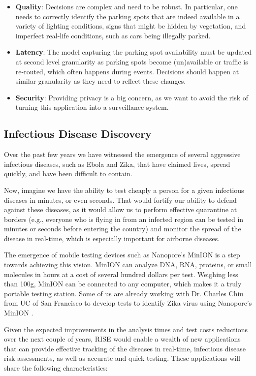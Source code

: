 \begin{itemize}[noitemsep,topsep=0pt,parsep=0pt,partopsep=0pt]
\item {\bf Quality}: Decisions are complex and need to be robust. In particular, one needs to correctly identify the parking spots that are indeed available in a variety of lighting conditions, signs that might be hidden by vegetation, and imperfect real-life conditions, such as cars being illegally parked.
\item {\bf Latency}: The model capturing the parking spot availability must be updated at second level granularity as parking spots become (un)available or traffic is re-routed, which often happens during events. Decisions should happen at similar granularity as they need to reflect these changes.
\item {\bf Security}: Providing privacy is a big concern, as we want to avoid the risk of turning this application into a surveillance system.
\end{itemize}

\subsection{Infectious Disease Discovery}

Over the past few years we have witnessed the emergence of several aggressive infectious diseases, such as Ebola and Zika, that have claimed lives, spread quickly, and have been difficult to contain. 

Now, imagine  we have the ability to test cheaply a person for a given infectious diseases in minutes, or even seconds. That would fortify our ability to defend against these diseases, as it would allow us to perform effective quarantine at borders (e.g., everyone who is flying in from an infected region can be tested in minutes or seconds before entering the country) and monitor the spread of the disease in real-time, which is especially important for airborne diseases.

The emergence of mobile testing devices such as Nanopore's MinION is a step towards achieving this vision. MinION can analyze DNA, RNA, proteins, or small molecules in hours at a cost of several hundred dollars per test. Weighing less than 100g, MinION can be connected to any computer, which makes it a truly portable testing station. Some of us are already working with Dr. Charles Chiu from UC of San Francisco to develop tests to identify Zika virus using Nanopore’s MinION . 

Given the expected improvements in the analysis times and test costs reductions over the next couple of years, RISE would enable a wealth of new applications that can provide effective tracking of the diseases in real-time, infectious disease risk assessments, as well as accurate and quick testing. These applications will share the following characteristics:

